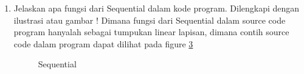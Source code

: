 \begin{enumerate}
	\begin{figure}[!htbp]
		\caption{np.unique}
		\label{YNC6-6}
	\end{figure}	

	\subitem Fungsi dari to\_categorical yaitu untuk mengubah vektor ke dalam matriks class biner. Contoh source code to\_categorical dapat dilihat pada figure \ref{YNC6-7}

	\begin{figure}[!htbp]
		\caption{categorical}
		\label{YNC6-7}
	\end{figure}	

\item Jelaskan apa fungsi dari Sequential dalam kode program. Dilengkapi dengan ilustrasi atau gambar !
	\subitem Dimana fungsi dari Sequential dalam source code program hanyalah sebagai tumpukan linear lapisan, dimana contih source code dalam program dapat dilihat pada figure \ref{YNC6-8}

	\begin{figure}[!htbp]
		\caption{Sequential}
		\label{YNC6-8}
	\end{figure}

\end{enumerate}
